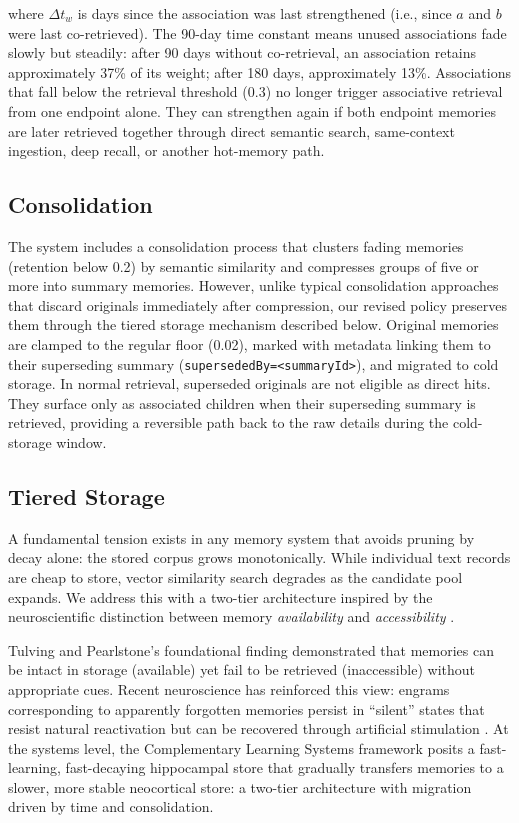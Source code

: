 \documentclass[11pt,a4paper]{article}
\begin{document}
\noindent where $\Delta t_w$ is days since the association was last strengthened (i.e., since $a$ and $b$ were last co-retrieved). The 90-day time constant means unused associations fade slowly but steadily: after 90 days without co-retrieval, an association retains approximately 37\% of its weight; after 180 days, approximately 13\%. Associations that fall below the retrieval threshold (0.3) no longer trigger associative retrieval from one endpoint alone. They can strengthen again if both endpoint memories are later retrieved together through direct semantic search, same-context ingestion, deep recall, or another hot-memory path.

\subsection{Consolidation}
\label{sec:consolidation}

The system includes a consolidation process that clusters fading memories (retention below 0.2) by semantic similarity and compresses groups of five or more into summary memories. However, unlike typical consolidation approaches that discard originals immediately after compression, our revised policy preserves them through the tiered storage mechanism described below. Original memories are clamped to the regular floor (0.02), marked with metadata linking them to their superseding summary (\texttt{supersededBy=<summaryId>}), and migrated to cold storage. In normal retrieval, superseded originals are not eligible as direct hits. They surface only as associated children when their superseding summary is retrieved, providing a reversible path back to the raw details during the cold-storage window.

\subsection{Tiered Storage}
\label{sec:tiered}

A fundamental tension exists in any memory system that avoids pruning by decay alone: the stored corpus grows monotonically. While individual text records are cheap to store, vector similarity search degrades as the candidate pool expands. We address this with a two-tier architecture inspired by the neuroscientific distinction between memory \emph{availability} and \emph{accessibility} \citep{tulving1966availability}.

Tulving and Pearlstone's foundational finding demonstrated that memories can be intact in storage (available) yet fail to be retrieved (inaccessible) without appropriate cues. Recent neuroscience has reinforced this view: engrams corresponding to apparently forgotten memories persist in ``silent'' states that resist natural reactivation but can be recovered through artificial stimulation \citep{ryan2022forgetting, guskjolen2024forgetting}. At the systems level, the Complementary Learning Systems framework \citep{mcclelland1995complementary} posits a fast-learning, fast-decaying hippocampal store that gradually transfers memories to a slower, more stable neocortical store: a two-tier architecture with migration driven by time and consolidation.
\end{document}
